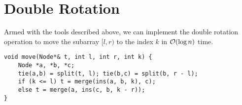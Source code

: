 \newpage
\section{Double Rotation}
Armed with the tools described above, we can implement the double rotation operation to move the subarray $[l, r)$ to the index $k$ in $\mathcal{O}(\log n)$ time.

\begin{lstlisting}
void move(Node*& t, int l, int r, int k) {
    Node *a, *b, *c;
    tie(a,b) = split(t, l); tie(b,c) = split(b, r - l);
    if (k <= l) t = merge(ins(a, b, k), c);
    else t = merge(a, ins(c, b, k - r));
}
\end{lstlisting}

